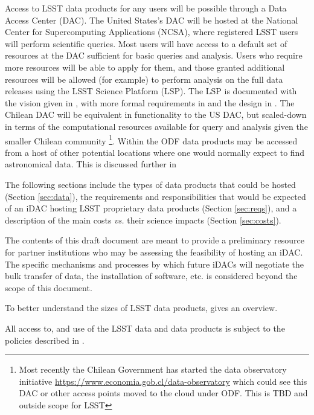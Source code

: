 Access to LSST data products for any users will be possible through a Data Access Center (DAC). The United States's DAC will be hosted at the National Center for Supercomputing Applications (NCSA),
where registered LSST users will perform scientific queries. Most users will have access to a default set of resources at the DAC sufficient for basic queries and analysis. Users who require more resources will be able to apply for them, and those granted additional resources will be allowed (for example) to perform analysis on the full data releases using the LSST Science Platform (LSP). The LSP is documented with the vision given in , with more formal requirements in  and the design in . The Chilean DAC will be equivalent in functionality to the US DAC, but scaled-down in terms of the computational resources available for query and analysis given the smaller Chilean community \footnote{Most recently the Chilean Government has started the data observatory initiative \url{https://www.economia.gob.cl/data-observatory} which could see this DAC or other access points moved to the cloud under ODF. This is TBD and outside scope for LSST}.
Within the ODF data products may be accessed from a host of other potential locations where one would normally expect to find astronomical data. This is discussed further in 

The following sections include the types of data products that could be hosted (Section \ref{sec:data}), the requirements and responsibilities that would be expected of an iDAC hosting LSST proprietary data products (Section \ref{sec:reqs}), and a description of the main costs {\it vs.} their science impacts (Section \ref{sec:costs}).

The contents of this draft document are meant to provide a preliminary resource for partner institutions who may be assessing the feasibility of hosting an iDAC. The specific mechanisms and processes by which future iDACs will negotiate the bulk transfer of data, the installation of software, etc. is considered beyond the scope of this document.

To better understand the sizes of LSST data products,  gives an overview.



All access to, and use of the LSST data and data products is subject to the policies described in .